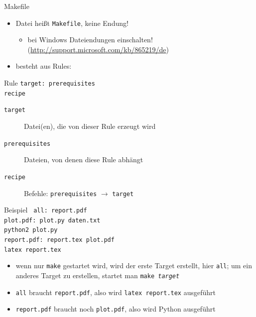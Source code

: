 \begin{frame}{Makefile}
  \begin{itemize}
    \item Datei heißt \texttt{Makefile}, keine Endung!
      \begin{itemize}
        \item bei Windows Dateiendungen einschalten! (\url{http://support.microsoft.com/kb/865219/de})
      \end{itemize}
    \item besteht aus Rules:
  \end{itemize}
  \begin{block}{Rule}
    \texttt{target: prerequisites\\
    \hspace{1cm} recipe}
  \end{block}
  \begin{description}
    \item[\texttt{target}] Datei(en), die von dieser Rule erzeugt wird
    \item[\texttt{prerequisites}] Dateien, von denen diese Rule abhängt
    \item[\texttt{recipe}] Befehle: \texttt{prerequisites} $\rightarrow$ \texttt{target}
  \end{description}
\end{frame}

\begin{frame}[shrink]{Beispiel}
  \texttt{\footnotesize
    all: report.pdf\\[0.3cm]
    plot.pdf: plot.py daten.txt\\
    \hspace{1cm} python2 plot.py\\[0.3cm]
    report.pdf: report.tex plot.pdf\\
    \hspace{1cm} latex report.tex\\[0.3cm]
  }

  \begin{itemize}
    \item wenn nur \texttt{make} gestartet wird, wird der erste Target erstellt, hier \texttt{all}; um ein anderes Target zu erstellen, startet man \texttt{make \textit{target}}
    \item \texttt{all} braucht \texttt{report.pdf}, also wird \texttt{latex report.tex} ausgeführt
    \item \texttt{report.pdf} braucht noch \texttt{plot.pdf}, also wird Python ausgeführt
  \end{itemize}
\end{frame}
